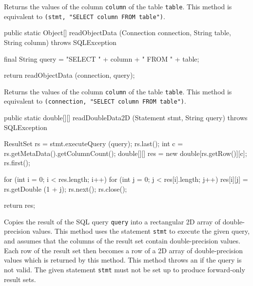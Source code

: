 \begin{tabb}
   Returns the values of the column \texttt{column} of the table \texttt{table}.
   This method is equivalent to 
   \texttt{(stmt, "SELECT column FROM table")}.
\end{tabb}
\begin{code}

   public static Object[] readObjectData (Connection connection,
                                          String table, String column)
            throws SQLException\begin{hide} {
        final String query = "SELECT " + column + " FROM " + table;
        
        return readObjectData (connection, query);
    }\end{hide}
\end{code}
\begin{tabb}
   Returns the values of the column \texttt{column} of the table \texttt{table}.
   This method is equivalent to 
   \texttt{(connection, "SELECT column FROM table")}.
\end{tabb}
\begin{code}

   public static double[][] readDoubleData2D (Statement stmt, String query)
            throws SQLException\begin{hide} {
      ResultSet rs = stmt.executeQuery (query);
      rs.last();
      int c = rs.getMetaData().getColumnCount();
      double[][] res = new double[rs.getRow()][c];
      rs.first();
        
      for (int i = 0; i < res.length; i++) {
         for (int j = 0; j < res[i].length; j++)
            res[i][j] = rs.getDouble (1 + j);
         rs.next();
      }
      rs.close();
            
      return res;
   }\end{hide}
\end{code}
\begin{tabb}
   Copies the result of the SQL query \texttt{query} into a
   rectangular 2D array of double-precision values.
   This method uses the statement \texttt{stmt} to execute the given query, and
   assumes that the columns of the result set contain double-precision values.
   Each row of the result set then becomes a row of a 2D array of double-precision
   values which is returned by this method.
    This method throws an  if the query is not valid.
   The given statement \texttt{stmt} must not be set up to
   produce forward-only result sets.
\end{tabb}
